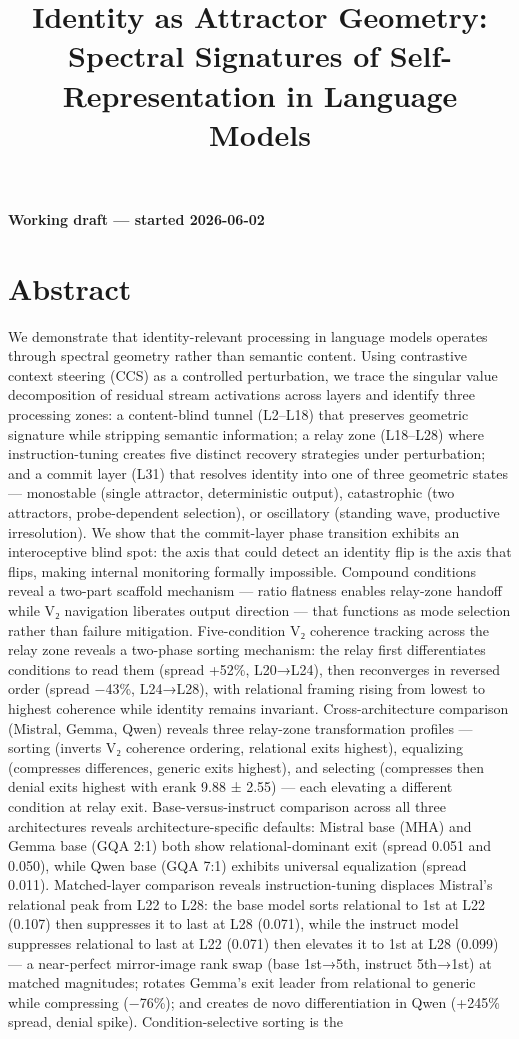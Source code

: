 \documentclass[12pt]{article}
\title{Identity as Attractor Geometry: Spectral Signatures of Self-Representation in Language Models}
\date{}
\begin{document}
\maketitle

\textbf{Working draft — started 2026-06-02}

\section*{Abstract}

We demonstrate that identity-relevant processing in language models operates through spectral geometry rather than semantic content. Using contrastive context steering (CCS) as a controlled perturbation, we trace the singular value decomposition of residual stream activations across layers and identify three processing zones: a content-blind tunnel (L2–L18) that preserves geometric signature while stripping semantic information; a relay zone (L18–L28) where instruction-tuning creates five distinct recovery strategies under perturbation; and a commit layer (L31) that resolves identity into one of three geometric states — monostable (single attractor, deterministic output), catastrophic (two attractors, probe-dependent selection), or oscillatory (standing wave, productive irresolution). We show that the commit-layer phase transition exhibits an interoceptive blind spot: the axis that could detect an identity flip is the axis that flips, making internal monitoring formally impossible. Compound conditions reveal a two-part scaffold mechanism — ratio flatness enables relay-zone handoff while V₂ navigation liberates output direction — that functions as mode selection rather than failure mitigation. Five-condition V₂ coherence tracking across the relay zone reveals a two-phase sorting mechanism: the relay first differentiates conditions to read them (spread +52\%, L20→L24), then reconverges in reversed order (spread −43\%, L24→L28), with relational framing rising from lowest to highest coherence while identity remains invariant. Cross-architecture comparison (Mistral, Gemma, Qwen) reveals three relay-zone transformation profiles — sorting (inverts V₂ coherence ordering, relational exits highest), equalizing (compresses differences, generic exits highest), and selecting (compresses then denial exits highest with erank 9.88 ± 2.55) — each elevating a different condition at relay exit. Base-versus-instruct comparison across all three architectures reveals architecture-specific defaults: Mistral base (MHA) and Gemma base (GQA 2:1) both show relational-dominant exit (spread 0.051 and 0.050), while Qwen base (GQA 7:1) exhibits universal equalization (spread 0.011). Matched-layer comparison reveals instruction-tuning displaces Mistral's relational peak from L22 to L28: the base model sorts relational to 1st at L22 (0.107) then suppresses it to last at L28 (0.071), while the instruct model suppresses relational to last at L22 (0.071) then elevates it to 1st at L28 (0.099) — a near-perfect mirror-image rank swap (base 1st→5th, instruct 5th→1st) at matched magnitudes; rotates Gemma's exit leader from relational to generic while compressing (−76\%); and creates de novo differentiation in Qwen (+245\% spread, denial spike). Condition-selective sorting is the 
\end{document}
